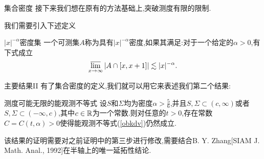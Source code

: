 \iffalse
\begin{frame}[t]
  The strategy to prove (\ref{7}) is to construct the operator
  \begin{equation}\label{8}
    Tf := \chi_{S}S(-t)\left( \chi_{\Sigma}S(t)f \right).  
  \end{equation}
  and claim that $T$ is a compact operator and $\|T\|<1$.

 \begin{equation}
   Tf(x)=\int \chi_{S}(x)\left( \int E(-t,x-w)\chi_\Sigma(w) E(t,w-y)\,\mathrm{d}w \right) f(y)\,\mathrm{d}y.
 \end{equation}
 Define $K(x,y)=\chi_S(x)\int E(-t,x-w)\chi_{\Sigma}(w)E(t,w-y)\,\mathrm{d}w $. Then 
\begin{equation}
  Tf(x)= \int K(x,y)f(y)\,\mathrm{d}y.
\end{equation}

\end{frame}
\fi
\begin{frame}[t]{集合密度}
  接下来我们想在原有的方法基础上,突破测度有限的限制.

  我们需要引入下述定义
  \begin{block}{$|x|^{-\alpha}$密度集}
    一个可测集$A$称为具有$|x|^{-\alpha}$密度,如果其满足:对于一个给定的$\alpha>0$,有下式成立
    \begin{equation}
      \varlimsup_{x\to \infty}|A\cap [x,x+1]|\lesssim|x|^{-\alpha}.
    \end{equation}
  \end{block}
\end{frame}

\begin{frame}[t]{主要结果II}
  有了集合密度的定义,我们就可以用它来表述我们第二个结果:
  \begin{alertblock}{测度可能无限的能观测不等式}
    设$S$和$\Sigma$均为密度$\alpha>\frac{5}{6}$,并且$S,\Sigma \subset (c,\infty)$或者$S,\Sigma\subset (-\infty,c)$,其中$c\in \mathbb{R}$为一个常数.则对任意的$t>0$,存在常数$C=C(t,\alpha)>0$使得能观测不等式(\ref{obkdv})仍然成立.
  \end{alertblock}
  该结果的证明需要对之前证明中的第三步进行修改,需要结合B. Y. Zhang[SIAM J. Math. Anal., 1992]在半轴上的唯一延拓性结论.
\end{frame}

